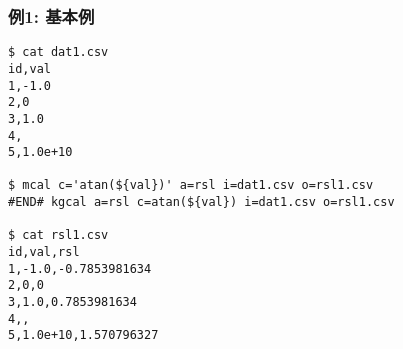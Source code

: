
\subsubsection*{例1: 基本例}


\begin{Verbatim}[baselinestretch=0.7,frame=single]
$ cat dat1.csv
id,val
1,-1.0
2,0
3,1.0
4,
5,1.0e+10

$ mcal c='atan(${val})' a=rsl i=dat1.csv o=rsl1.csv
#END# kgcal a=rsl c=atan(${val}) i=dat1.csv o=rsl1.csv

$ cat rsl1.csv
id,val,rsl
1,-1.0,-0.7853981634
2,0,0
3,1.0,0.7853981634
4,,
5,1.0e+10,1.570796327
\end{Verbatim}

